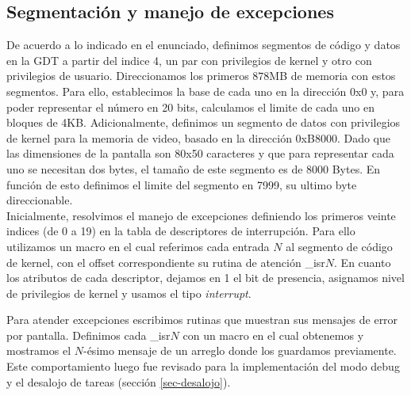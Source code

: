 
\subsection{Segmentación y manejo de excepciones}

De acuerdo a lo indicado en el enunciado, definimos segmentos de código y datos en la GDT a partir del indice 4, un par con privilegios de kernel y otro con privilegios de usuario. 
Direccionamos los primeros $878$MB de memoria con estos segmentos.
Para ello, establecimos la base de cada uno en la dirección 0x0 y, para poder representar el número en 20 bits, calculamos el limite de cada uno en bloques de 4KB. 
Adicionalmente, definimos un segmento de datos con privilegios de kernel para la memoria de video, basado en la dirección 0xB8000. Dado que las dimensiones de la pantalla son 80x50 caracteres y que para representar cada uno se necesitan dos bytes, el tamaño de este segmento es de 8000 Bytes. En función de esto definimos el limite del segmento en 7999, su ultimo byte direccionable.\\

Inicialmente, resolvimos el manejo de excepciones definiendo los primeros veinte indices (de 0 a 19) en la tabla de descriptores de interrupción. 
Para ello utilizamos un macro en el cual referimos cada entrada $N$ al segmento de código de kernel, con el offset correspondiente su rutina de atención \_isr$N$. 
En cuanto los atributos de cada descriptor, dejamos en 1 el bit de presencia, asignamos nivel de privilegios de kernel y usamos el tipo \textit{interrupt}.

Para atender excepciones escribimos rutinas que muestran sus mensajes de error por pantalla.
Definimos cada \_isr$N$ con un macro en el cual obtenemos y mostramos el $N$-ésimo mensaje de un arreglo donde los guardamos previamente.\\

Este comportamiento luego fue revisado para la implementación del modo debug y el desalojo de tareas (sección \ref{sec-desalojo}).
